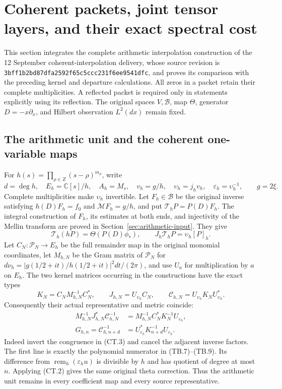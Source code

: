 \section{Coherent packets, joint tensor layers, and their exact spectral cost}
\label{sec:coherent-tensor-integration}

This section integrates the complete arithmetic interpolation construction
of the 12 September coherent-interpolation delivery, whose source revision
is \nolinkurl{3bff1b2bd87dfa2592f65c5ccc231f6ee9541dfc}, and proves its
comparison with the preceding kernel and departure calculations.  All
zeros in a packet retain their complete multiplicities.  A reflected
packet is required only in statements explicitly using its reflection.
The original spaces \(V,\mathscr B\), map \(\Theta\), generator
\(D=-x\partial_x\), and Hilbert observation \(L^2(dx)\) remain fixed.

\subsection{The arithmetic unit and the coherent one-variable maps}

For \(h(s)=\prod_{\rho\in Z}(s-\rho)^{m_\rho}\), write
\[
 d=\deg h,\quad E_h=\mathbb C[s]/h,\quad A_h=M_s,\quad
 v_h=g/h,\quad \upsilon_h=j_hv_h,\quad
 \varepsilon_h=\upsilon_h^{-1},\qquad g=2\xi.
 \tag{CT.1}
\]
Complete multiplicities make \(\upsilon_h\) invertible.  Let
\(F_h\in\mathscr B\) be the original inverse satisfying
\(h(D)F_h=f_0\) and \(\mathcal MF_h=g/h\), and put
\(\mathcal T_hP=P(D)F_h\).  The integral construction of
\(F_h\), its estimates at both ends, and injectivity of the Mellin
transform are proved in Section~\ref{sec:arithmetic-input}.  They give
\[
 \mathcal T_h(hP)=\Theta(P(D)\phi_*),\qquad
 J_h\mathcal T_hP=\upsilon_h[P]_h.                       \tag{CT.2}
\]
Let \(C_N:\mathcal P_N\to E_h\) be the full remainder map in
the original monomial coordinates, let \(M_{h,N}\) be the Gram
matrix of \(\mathcal P_N\) for
\(d\nu_h=|g(1/2+it)/h(1/2+it)|^2dt/(2\pi)\), and use
\(U_a\) for multiplication by \(a\) on \(E_h\).  The two
kernel matrices occurring in the constructions have the exact types
\[
 K_N=C_NM_{h,N}^{-1}C_N^*,\qquad
 J_{h,N}=U_{\upsilon_h}C_N,\qquad
 \mathcal C_{h,N}=U_{\upsilon_h}K_NU_{\upsilon_h}^*.
 \tag{CT.3}
\]
Consequently their actual representative and metric coincide:
\[
 \begin{split}
 M_{h,N}^{-1}J_{h,N}^*\mathcal C_{h,N}^{-1}
   &=M_{h,N}^{-1}C_N^*K_N^{-1}U_{\varepsilon_h},\\
 G_{h,n}=\mathcal C_{h,n+d}^{-1}
   &=U_{\varepsilon_h}^*K_{n+d}^{-1}U_{\varepsilon_h}.
 \end{split}                                                   \tag{CT.4}
\]
Indeed invert the congruence in (CT.3) and cancel the adjacent
inverse factors.  The first line is exactly the polynomial numerator
in (TB.7)--(TB.9).  Its difference from
\(\operatorname{rem}_h(\varepsilon_hu)\) is divisible by \(h\)
and has quotient of degree at most \(n\).  Applying (CT.2) gives
the same original theta correction.  Thus the arithmetic unit remains
in every coefficient map and every source representative.

